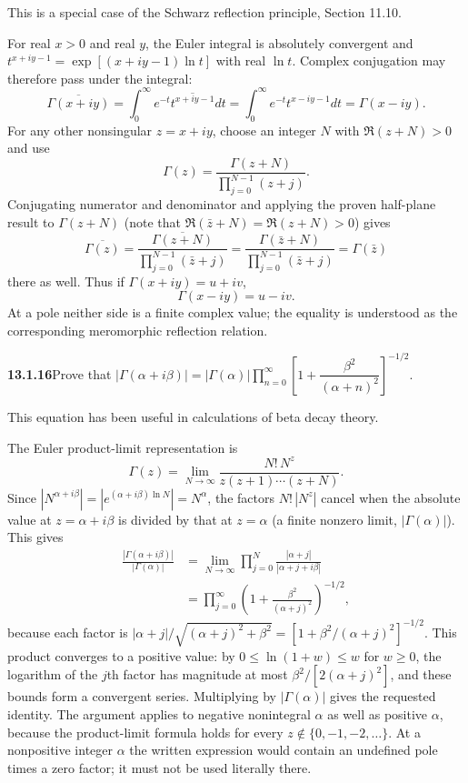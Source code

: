 This is a special case of the Schwarz reflection principle, Section 11.10.
\par\smallskip
{}
\solution
For real $x>0$ and real $y$, the Euler integral is absolutely
convergent and $t^{x+iy-1}=\exp[(x+iy-1)\ln t]$ with real $\ln t$.
Complex conjugation may therefore pass under the integral:
\[
\overline{\Gamma(x+iy)}
=\int_0^\infty e^{-t}\overline{t^{x+iy-1}}dt
=\int_0^\infty e^{-t}t^{x-iy-1}dt
=\Gamma(x-iy).
\]
For any other nonsingular $z=x+iy$, choose an integer $N$ with
$\Re(z+N)>0$ and use
\[
\Gamma(z)=\frac{\Gamma(z+N)}{\prod_{j=0}^{N-1}(z+j)}.
\]
Conjugating numerator and denominator and applying the proven
half-plane result to $\Gamma(z+N)$ (note that
$\Re(\bar z+N)=\Re(z+N)>0$) gives
\[
\overline{\Gamma(z)}
=\frac{\overline{\Gamma(z+N)}}{\prod_{j=0}^{N-1}(\bar z+j)}
=\frac{\Gamma(\bar z+N)}{\prod_{j=0}^{N-1}(\bar z+j)}
=\Gamma(\bar z)
\]
there as well.  Thus if $\Gamma(x+iy)=u+iv$,
\[
\boxed{\Gamma(x-iy)=u-iv}.
\]
At a pole neither side is a finite complex value; the equality is
understood as the corresponding meromorphic reflection relation.


\par\bigskip
\noindent\textbf{13.1.16}\quad Prove that
$|\Gamma(\alpha+i\beta)|=|\Gamma(\alpha)|
\displaystyle\prod_{n=0}^{\infty}\left[1+\dfrac{\beta^{2}}{(\alpha+n)^{2}}
\right]^{-1/2}$.

This equation has been useful in calculations of beta decay theory.
\par\smallskip
{}
\solution
{}
The Euler product-limit representation is
\[
\Gamma(z)=\lim_{N\to\infty}
\frac{N!\,N^z}{z(z+1)\cdots(z+N)}.
\]
Since $|N^{\alpha+i\beta}|=|e^{(\alpha+i\beta)\ln N}|=N^\alpha$, the
factors $N!\,|N^z|$ cancel when the absolute value at
$z=\alpha+i\beta$ is divided by that at $z=\alpha$ (a finite nonzero
limit, $|\Gamma(\alpha)|$).  This gives
\begin{align*}
\frac{|\Gamma(\alpha+i\beta)|}{|\Gamma(\alpha)|}
&=\lim_{N\to\infty}\prod_{j=0}^N
 \frac{|\alpha+j|}{|\alpha+j+i\beta|}\\
&=\prod_{j=0}^\infty
 \left(1+\frac{\beta^2}{(\alpha+j)^2}\right)^{-1/2},
\end{align*}
because each factor is
$|\alpha+j|/\sqrt{(\alpha+j)^2+\beta^2}
=[1+\beta^2/(\alpha+j)^2]^{-1/2}$.
This product converges to a positive value: by
$0\le\ln(1+w)\le w$ for $w\ge0$, the logarithm of the $j$th factor
has magnitude at most $\beta^2/[2(\alpha+j)^2]$, and these bounds
form a convergent series.
Multiplying by $|\Gamma(\alpha)|$ gives the requested identity.
The argument applies to negative nonintegral $\alpha$ as well as
positive $\alpha$, because the product-limit formula holds for every
$z\notin\{0,-1,-2,\ldots\}$.
At a nonpositive integer $\alpha$ the written expression would
contain an undefined pole times a zero factor; it must not be used
literally there.



